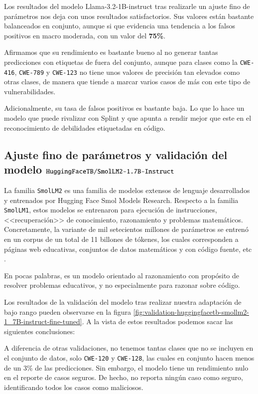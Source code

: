 \documentclass[12pt, a4paper, twoside]{article}
\begin{document}
Los resultados del modelo Llama-3.2-1B-instruct tras realizarle un ajuste fino de parámetros nos deja con unos resultados satisfactorios. Sus valores están bastante balanceados en conjunto, aunque si que evidencia una tendencia a los falsos positivos en macro moderada, con un valor del \textbf{75\%}.

Afirmamos que su rendimiento es bastante bueno al no generar tantas predicciones con etiquetas de fuera del conjunto, aunque para clases como la \texttt{CWE-416}, \texttt{CWE-789} y \texttt{CWE-123} no tiene unos valores de precisión tan elevados como otras clases, de manera que tiende a marcar varios casos de más con este tipo de vulnerabilidades.

Adicionalmente, su tasa de falsos positivos es bastante baja. Lo que lo hace un modelo que puede rivalizar con Splint y que apunta a rendir mejor que este en el reconocimiento de debilidades etiquetadas en código.

\subsection{Ajuste fino de parámetros y validación del modelo $\protect\\ \texttt{HuggingFaceTB/SmolLM2-1.7B-Instruct}$}
La familia \texttt{SmolLM2} es una familia de modelos extensos de lenguaje desarrollados y entrenados por Hugging Face Smol Models Research. Respecto a la familia \texttt{SmolLM1}, estos modelos se entrenaron para ejecución de instrucciones, <<recuperación>> de conocimiento, razonamiento y problemas matemáticos. Concretamente, la variante de mil setecientos millones de parámetros se entrenó en un corpus de un total de 11 billones de tókenes, los cuales corresponden a páginas web educativas, conjuntos de datos matemáticos y con código fuente, etc \cite{smollm2-1_7b-instruct}.

En pocas palabras, es un modelo orientado al razonamiento con propósito de resolver problemas educativos, y no especialmente para razonar sobre código.

Los resultados de la validación del modelo tras realizar nuestra adaptación de bajo rango pueden observarse en la figura \ref{fig:validation-huggingfacetb-smollm2-1_7B-instruct-fine-tuned}. A la vista de estos resultados podemos sacar las siguientes conclusiones:

A diferencia de otras validaciones, no tenemos tantas clases que no se incluyen en el conjunto de datos, solo \texttt{CWE-120} y \texttt{CWE-128}, las cuales en conjunto hacen menos de un 3\% de las predicciones. Sin embargo, el modelo tiene un rendimiento nulo en el reporte de casos seguros. De hecho, no reporta ningún caso como seguro, identificando todos los casos como maliciosos.
\end{document}
